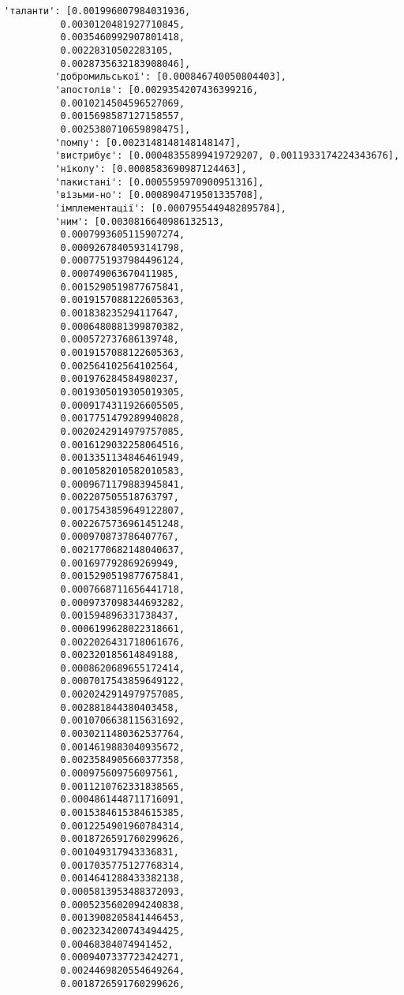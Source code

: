 \documentclass[11pt]{article}
\begin{document}
\begin{Verbatim}[commandchars=\\\{\}]
         'таланти': [0.001996007984031936,
          0.0030120481927710845,
          0.0035460992907801418,
          0.00228310502283105,
          0.0028735632183908046],
         'добромильської': [0.000846740050804403],
         'апостолів': [0.0029354207436399216,
          0.0010214504596527069,
          0.0015698587127158557,
          0.0025380710659898475],
         'помпу': [0.0023148148148148147],
         'вистрибує': [0.00048355899419729207, 0.0011933174224343676],
         'ніколу': [0.0008583690987124463],
         'пакистані': [0.0005595970900951316],
         'візьми-но': [0.0008904719501335708],
         'імплементації': [0.0007955449482895784],
         'ним': [0.0030816640986132513,
          0.0007993605115907274,
          0.0009267840593141798,
          0.0007751937984496124,
          0.000749063670411985,
          0.0015290519877675841,
          0.0019157088122605363,
          0.001838235294117647,
          0.0006480881399870382,
          0.000572737686139748,
          0.0019157088122605363,
          0.002564102564102564,
          0.001976284584980237,
          0.0019305019305019305,
          0.0009174311926605505,
          0.0017751479289940828,
          0.0020242914979757085,
          0.0016129032258064516,
          0.0013351134846461949,
          0.0010582010582010583,
          0.0009671179883945841,
          0.002207505518763797,
          0.0017543859649122807,
          0.0022675736961451248,
          0.000970873786407767,
          0.0021770682148040637,
          0.001697792869269949,
          0.0015290519877675841,
          0.0007668711656441718,
          0.0009737098344693282,
          0.001594896331738437,
          0.0006199628022318661,
          0.0022026431718061676,
          0.002320185614849188,
          0.0008620689655172414,
          0.0007017543859649122,
          0.0020242914979757085,
          0.002881844380403458,
          0.0010706638115631692,
          0.0030211480362537764,
          0.0014619883040935672,
          0.0023584905660377358,
          0.000975609756097561,
          0.0011210762331838565,
          0.0004861448711716091,
          0.0015384615384615385,
          0.0012254901960784314,
          0.0018726591760299626,
          0.001049317943336831,
          0.0017035775127768314,
          0.0014641288433382138,
          0.0005813953488372093,
          0.0005235602094240838,
          0.0013908205841446453,
          0.0023234200743494425,
          0.00468384074941452,
          0.0009407337723424271,
          0.0024469820554649264,
          0.0018726591760299626,

\end{Verbatim}
\end{document}
